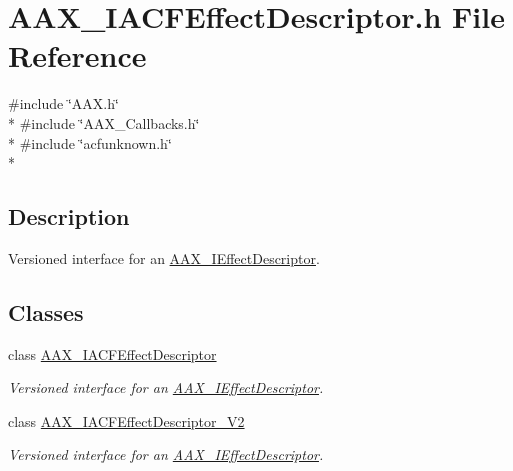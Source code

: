 \hypertarget{a00221}{}\section{A\+A\+X\+\_\+\+I\+A\+C\+F\+Effect\+Descriptor.\+h File Reference}
\label{a00221}
{\ttfamily \#include \char`\"{}A\+A\+X.\+h\char`\"{}}\\*
{\ttfamily \#include \char`\"{}A\+A\+X\+\_\+\+Callbacks.\+h\char`\"{}}\\*
{\ttfamily \#include \char`\"{}acfunknown.\+h\char`\"{}}\\*


\subsection{Description}
Versioned interface for an \hyperlink{a00096}{A\+A\+X\+\_\+\+I\+Effect\+Descriptor}. 

\subsection*{Classes}
\begin{DoxyCompactItemize}
\item 
class \hyperlink{a00057}{A\+A\+X\+\_\+\+I\+A\+C\+F\+Effect\+Descriptor}
\begin{DoxyCompactList}\small\item\em Versioned interface for an \hyperlink{a00096}{A\+A\+X\+\_\+\+I\+Effect\+Descriptor}. \end{DoxyCompactList}\item 
class \hyperlink{a00058}{A\+A\+X\+\_\+\+I\+A\+C\+F\+Effect\+Descriptor\+\_\+\+V2}
\begin{DoxyCompactList}\small\item\em Versioned interface for an \hyperlink{a00096}{A\+A\+X\+\_\+\+I\+Effect\+Descriptor}. \end{DoxyCompactList}\end{DoxyCompactItemize}
